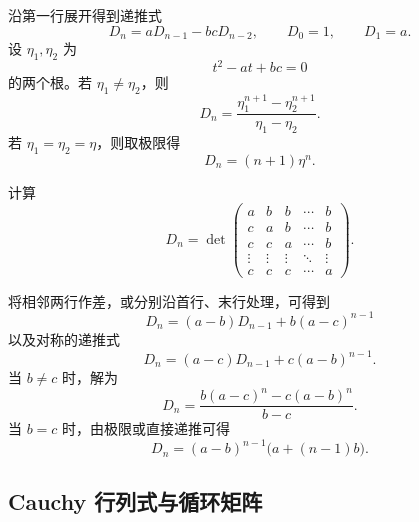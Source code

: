 \begin{solution}
沿第一行展开得到递推式
\begin{equation}
 D_n=aD_{n-1}-bcD_{n-2},
 \qquad D_0=1,
 \qquad D_1=a.
\end{equation}
设 $\eta_1,\eta_2$ 为
\begin{equation}
 t^2-at+bc=0
\end{equation}
的两个根。若 $\eta_1\neq\eta_2$，则
\begin{equation}
 D_n=\frac{\eta_1^{n+1}-\eta_2^{n+1}}{\eta_1-\eta_2}.
\end{equation}
若 $\eta_1=\eta_2=\eta$，则取极限得
\begin{equation}
 D_n=(n+1)\eta^n.
\end{equation}
\end{solution}

\begin{exercise}
计算
\begin{equation}
 D_n=\det\begin{pmatrix}
 a&b&b&\cdots&b\\
 c&a&b&\cdots&b\\
 c&c&a&\cdots&b\\
 \vdots&\vdots&\vdots&\ddots&\vdots\\
 c&c&c&\cdots&a
 \end{pmatrix}.
\end{equation}
\end{exercise}

\begin{solution}
将相邻两行作差，或分别沿首行、末行处理，可得到
\begin{equation}
 D_n=(a-b)D_{n-1}+b(a-c)^{n-1}
\end{equation}
以及对称的递推式
\begin{equation}
 D_n=(a-c)D_{n-1}+c(a-b)^{n-1}.
\end{equation}
当 $b\neq c$ 时，解为
\begin{equation}
 D_n=\frac{b(a-c)^n-c(a-b)^n}{b-c}.
\end{equation}
当 $b=c$ 时，由极限或直接递推可得
\begin{equation}
 D_n=(a-b)^{n-1}\bigl(a+(n-1)b\bigr).
\end{equation}
\end{solution}

\subsection{Cauchy 行列式与循环矩阵}

